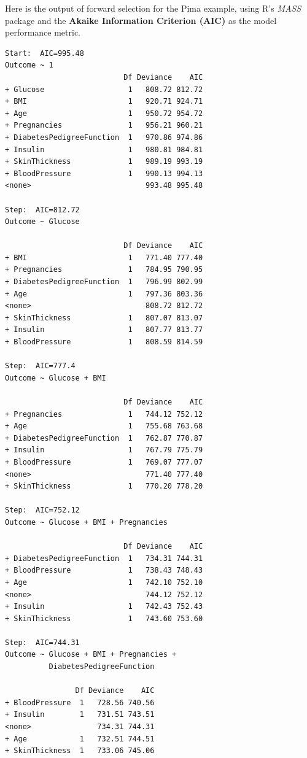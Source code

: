 \begin{question}{}
Here is the output of forward selection for the Pima example, using R's \emph{MASS} package and the \textbf{Akaike Information Criterion (AIC)} as the model performance metric.
{\footnotesize
\begin{verbatim}
Start:  AIC=995.48
Outcome ~ 1
                           Df Deviance    AIC
+ Glucose                   1   808.72 812.72
+ BMI                       1   920.71 924.71
+ Age                       1   950.72 954.72
+ Pregnancies               1   956.21 960.21
+ DiabetesPedigreeFunction  1   970.86 974.86
+ Insulin                   1   980.81 984.81
+ SkinThickness             1   989.19 993.19
+ BloodPressure             1   990.13 994.13
<none>                          993.48 995.48

Step:  AIC=812.72
Outcome ~ Glucose

                           Df Deviance    AIC
+ BMI                       1   771.40 777.40
+ Pregnancies               1   784.95 790.95
+ DiabetesPedigreeFunction  1   796.99 802.99
+ Age                       1   797.36 803.36
<none>                          808.72 812.72
+ SkinThickness             1   807.07 813.07
+ Insulin                   1   807.77 813.77
+ BloodPressure             1   808.59 814.59

Step:  AIC=777.4
Outcome ~ Glucose + BMI

                           Df Deviance    AIC
+ Pregnancies               1   744.12 752.12
+ Age                       1   755.68 763.68
+ DiabetesPedigreeFunction  1   762.87 770.87
+ Insulin                   1   767.79 775.79
+ BloodPressure             1   769.07 777.07
<none>                          771.40 777.40
+ SkinThickness             1   770.20 778.20

Step:  AIC=752.12
Outcome ~ Glucose + BMI + Pregnancies

                           Df Deviance    AIC
+ DiabetesPedigreeFunction  1   734.31 744.31
+ BloodPressure             1   738.43 748.43
+ Age                       1   742.10 752.10
<none>                          744.12 752.12
+ Insulin                   1   742.43 752.43
+ SkinThickness             1   743.60 753.60

Step:  AIC=744.31
Outcome ~ Glucose + BMI + Pregnancies + 
          DiabetesPedigreeFunction

                Df Deviance    AIC
+ BloodPressure  1   728.56 740.56
+ Insulin        1   731.51 743.51
<none>               734.31 744.31
+ Age            1   732.51 744.51
+ SkinThickness  1   733.06 745.06


\end{verbatim}}
\end{question}
